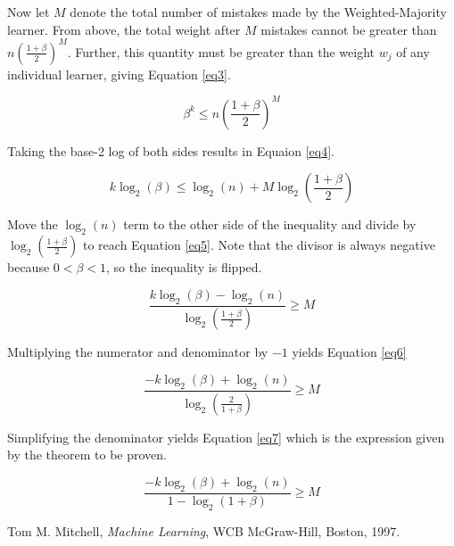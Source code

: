 \documentclass{article}
\begin{document}
Now let \(M\) denote the total number of mistakes made by the Weighted-Majority learner. From above, the total weight after \(M\) mistakes cannot be greater than \( n \left( \frac{1 + \beta}{2} \right) ^M \). Further, this quantity must be greater than the weight \(w_j\) of any individual learner, giving Equation \ref{eq3}.

\begin{equation}\label{eq3}
\beta^k \le n \left( \frac{1 + \beta}{2} \right) ^M
\end{equation}

Taking the base-2 log of both sides results in Equaion \ref{eq4}.

\begin{equation}\label{eq4}
k \log _2 \left( \beta \right) \le \log _2 \left( n \right) + M \log _2 \left( \frac{1 + \beta}{2} \right)
\end{equation}

Move the \(\log _2 \left( n \right)\) term to the other side of the inequality and divide by \(\log _2 \left( \frac{1 + \beta}{2} \right)\) to reach Equation \ref{eq5}. Note that the divisor is always negative because \(0 < \beta < 1\), so the inequality is flipped.

\begin{equation}\label{eq5}
\frac{k \log _2 \left( \beta \right) - \log _2 \left( n \right)}{ \log _2 \left( \frac{1 + \beta}{2} \right) } \ge M 
\end{equation}

Multiplying the numerator and denominator by \(-1\) yields Equation \ref{eq6}

\begin{equation}\label{eq6}
\frac{-k \log _2 \left( \beta \right) + \log _2 \left( n \right)}{ \log _2 \left( \frac{2}{1 + \beta} \right) } \ge M 
\end{equation}

Simplifying the denominator yields Equation \ref{eq7} which is the expression given by the theorem to be proven.

\begin{equation}\label{eq7}
\frac{-k \log _2 \left( \beta \right) + \log _2 \left( n \right)}{ 1 - \log _2 \left( 1 + \beta \right) } \ge M 
\end{equation}

\begin{thebibliography}{9}

  Tom M. Mitchell,
  \emph{Machine Learning},
  WCB McGraw-Hill, Boston,
  1997.

\end{thebibliography}
\end{document}
